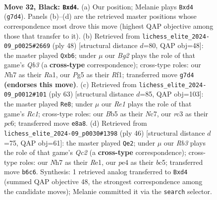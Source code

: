 \documentclass[11pt]{article}
\begin{document}
\clearpage

\begin{figure}[p]\centering
\begin{subfigure}{0.46\textwidth}\centering
\resizebox{\linewidth}{!}{%
\newchessgame
\chessboard[
  setfen={4r3/kp2p1bn/1r1p2Q1/1b4p1/3PP3/1PR2P2/6PP/1K1R4 b - - 9 32},
  showmover=false,
  pgfstyle=straightmove, color=movearrow, markmove={g7-d4}
]}
\caption{}
\end{subfigure}\hfill
\begin{subfigure}{0.46\textwidth}\centering
\resizebox{\linewidth}{!}{%
\newchessgame
\chessboard[
  setfen={4r1k1/r4p1p/pp4p1/4b3/P7/1Qq2BP1/5P1P/R4RK1 w - - 0 25},
  showmover=false,
  pgfstyle=straightmove, color=movearrow, markmove={b3-b6}
]}
\caption{}
\end{subfigure}
\\[4pt]
\begin{subfigure}{0.46\textwidth}\centering
\resizebox{\linewidth}{!}{%
\newchessgame
\chessboard[
  setfen={2r2k1r/2n2pp1/2Pp4/p1b2Q2/2P4p/7P/1P2RPP1/6K1 b - - 5 32},
  showmover=false,
  pgfstyle=straightmove, color=movearrow, markmove={c8-e8}
]}
\caption{}
\end{subfigure}\hfill
\begin{subfigure}{0.46\textwidth}\centering
\resizebox{\linewidth}{!}{%
\newchessgame
\chessboard[
  setfen={r2r3k/p5pp/1p6/1Pb5/2q2B2/2P5/2Q3PP/4RR1K w - - 1 24},
  showmover=false,
  pgfstyle=straightmove, color=movearrow, markmove={c2-e2}
]}
\caption{}
\end{subfigure}
\caption{\textbf{Move 32, Black: \texttt{Bxd4}.} (a) Our position; Melanie plays \texttt{Bxd4} (\texttt{g7d4}). Panels (b)--(d) are the retrieved master positions whose correspondence most drove this move (highest QAP objective among those that transfer to it). (b) Retrieved from \texttt{lichess\_elite\_2024-09\_p0025\#2669} (ply 48) [structural distance $d$=80, QAP obj=48]: the master played \texttt{Qxb6}; under $\mu$ our \emph{Bg2} plays the role of that game's \emph{Qb3} (a \textbf{cross-type} correspondence); cross-type roles: our \emph{N}h7 as their \emph{R}a1, our \emph{P}g5 as their \emph{R}f1; transferred move \texttt{g7d4} \textbf{(endorses this move)}. (c) Retrieved from \texttt{lichess\_elite\_2024-09\_p0012\#101} (ply 63) [structural distance $d$=85, QAP obj=103]: the master played \texttt{Re8}; under $\mu$ our \emph{Re1} plays the role of that game's \emph{Rc1}; cross-type roles: our \emph{B}b5 as their \emph{N}c7, our \emph{r}c3 as their \emph{p}c6; transferred move \texttt{e8a8}. (d) Retrieved from \texttt{lichess\_elite\_2024-09\_p0030\#1398} (ply 46) [structural distance $d$=75, QAP obj=61]: the master played \texttt{Qe2}; under $\mu$ our \emph{Rb3} plays the role of that game's \emph{Qc2} (a \textbf{cross-type} correspondence); cross-type roles: our \emph{N}h7 as their \emph{R}e1, our \emph{p}e4 as their \emph{b}c5; transferred move \texttt{b6c6}. Synthesis: 1 retrieved analog transferred to \texttt{Bxd4} (summed QAP objective 48, the strongest correspondence among the candidate moves); Melanie committed it via the \texttt{search} selector.}
\label{fig:thought-m63}
\end{figure}
\end{document}
